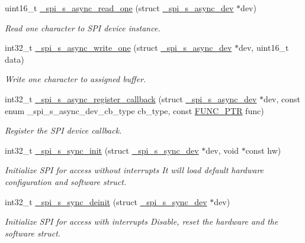 \begin{DoxyCompactItemize}
uint16\+\_\+t \hyperlink{group__hpl__spi_gacbb3e58ab1b546b509917700cd3b8f5f}{\+\_\+spi\+\_\+s\+\_\+async\+\_\+read\+\_\+one} (struct \hyperlink{group__hpl__spi_ga7ac9e8d408bc498841e8e461ad8656aa}{\+\_\+spi\+\_\+s\+\_\+async\+\_\+dev} $\ast$dev)
\begin{DoxyCompactList}\small\item\em Read one character to S\+PI device instance. \end{DoxyCompactList}\item 
int32\+\_\+t \hyperlink{group__hpl__spi_gadc1092adc8163cb6297ba493f1723b30}{\+\_\+spi\+\_\+s\+\_\+async\+\_\+write\+\_\+one} (struct \hyperlink{group__hpl__spi_ga7ac9e8d408bc498841e8e461ad8656aa}{\+\_\+spi\+\_\+s\+\_\+async\+\_\+dev} $\ast$dev, uint16\+\_\+t data)
\begin{DoxyCompactList}\small\item\em Write one character to assigned buffer. \end{DoxyCompactList}\item 
int32\+\_\+t \hyperlink{group__hpl__spi_ga58235b4c4fdd06abd22569c9728c2c6f}{\+\_\+spi\+\_\+s\+\_\+async\+\_\+register\+\_\+callback} (struct \hyperlink{group__hpl__spi_ga7ac9e8d408bc498841e8e461ad8656aa}{\+\_\+spi\+\_\+s\+\_\+async\+\_\+dev} $\ast$dev, const enum \+\_\+spi\+\_\+s\+\_\+async\+\_\+dev\+\_\+cb\+\_\+type cb\+\_\+type, const \hyperlink{group__doc__driver__hal__utils__macro_gae40b38bc5f5a5bd452bdd59c67d9a9cf}{F\+U\+N\+C\+\_\+\+P\+TR} func)
\begin{DoxyCompactList}\small\item\em Register the S\+PI device callback. \end{DoxyCompactList}\item 
int32\+\_\+t \hyperlink{group__hpl__spi_ga9bfff6aba1ac04a156b33b435497ed5a}{\+\_\+spi\+\_\+s\+\_\+sync\+\_\+init} (struct \hyperlink{group__hpl__spi_ga36cf082f9d7764b69f43a52f039e7165}{\+\_\+spi\+\_\+s\+\_\+sync\+\_\+dev} $\ast$dev, void $\ast$const hw)
\begin{DoxyCompactList}\small\item\em Initialize S\+PI for access without interrupts It will load default hardware configuration and software struct. \end{DoxyCompactList}\item 
int32\+\_\+t \hyperlink{group__hpl__spi_ga6f2703d1bbc1ae9e5924119709f6fadf}{\+\_\+spi\+\_\+s\+\_\+sync\+\_\+deinit} (struct \hyperlink{group__hpl__spi_ga36cf082f9d7764b69f43a52f039e7165}{\+\_\+spi\+\_\+s\+\_\+sync\+\_\+dev} $\ast$dev)
\begin{DoxyCompactList}\small\item\em Initialize S\+PI for access with interrupts Disable, reset the hardware and the software struct. \end{DoxyCompactList}\item 

\end{DoxyCompactItemize}
